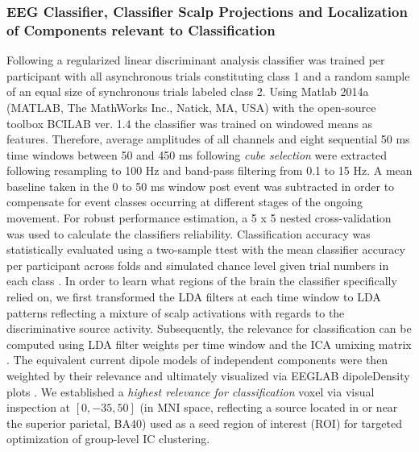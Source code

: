 \subsubsection{EEG Classifier, Classifier Scalp Projections and Localization of Components relevant to Classification}
Following \citet{Zander2016} a regularized linear discriminant analysis classifier was trained per participant with all asynchronous trials constituting class 1 and a random sample of an equal size of synchronous trials labeled class 2. Using Matlab 2014a (MATLAB, The MathWorks Inc., Natick, MA, USA) with the open-source toolbox BCILAB ver. 1.4 the classifier was trained on windowed means as features. Therefore, average amplitudes of all channels and eight sequential 50 ms time windows between 50 and 450 ms following \textit{cube selection} were extracted following resampling to 100 Hz and band-pass filtering from 0.1 to 15 Hz. A mean baseline taken in the 0 to 50 ms window post event was subtracted in order to compensate for event classes occurring at different stages of the ongoing movement. For robust performance estimation, a 5 x 5 nested cross-validation was used to calculate the classifiers reliability. Classification accuracy was statistically evaluated using a two-sample ttest with the mean classifier accuracy per participant across folds and simulated chance level given trial numbers in each class \cite{Muller-Putz2007}. In order to learn what regions of the brain the classifier specifically relied on, we first transformed the LDA filters at each time window to LDA patterns reflecting a mixture of scalp activations with regards to the discriminative source activity. Subsequently, the relevance for classification can be computed using LDA filter weights per time window and the ICA umixing matrix \cites{Haufe2014a, Zander2016}. The equivalent current dipole models of independent components were then weighted by their relevance and ultimately visualized via EEGLAB dipoleDensity plots \cite{Krol2019}. We established a \textit{highest relevance for classification} voxel via visual inspection at $[0, -35, 50]$ (in MNI space, reflecting a source located in or near the superior parietal, BA40) used as a seed region of interest (ROI) for targeted optimization of group-level IC clustering.


